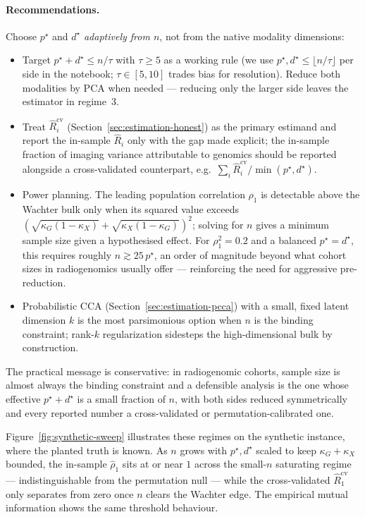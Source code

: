 \documentclass{article}
\begin{document}
\paragraph{Recommendations.} Choose $p^\star$ and $d^\star$ \emph{adaptively
from $n$}, not from the native modality dimensions:
\begin{itemize}
\item Target $p^\star + d^\star \le n/\tau$ with $\tau \ge 5$ as a working
rule (we use $p^\star, d^\star \le \lfloor n/\tau \rfloor$ per side in the
notebook; $\tau \in [5,10]$ trades bias for resolution). Reduce both
modalities by PCA when needed --- reducing only the larger side leaves the
estimator in regime~3.
\item Treat $\hat R_i^{\mathrm{cv}}$ (Section~\ref{sec:estimation-honest}) as
the primary estimand and report the in-sample $\hat R_i$ only with the gap
made explicit; the in-sample fraction of imaging variance attributable to
genomics should be reported alongside a cross-validated counterpart, e.g.\
$\sum_i \hat R_i^{\mathrm{cv}}/\min(p^\star, d^\star)$.
\item Power planning. The leading population correlation $\rho_1$ is detectable
above the Wachter bulk only when its squared value exceeds
$(\sqrt{\kappa_G(1-\kappa_X)} + \sqrt{\kappa_X(1-\kappa_G)})^2$; solving for $n$
gives a minimum sample size given a hypothesised effect. For
$\rho_1^2 = 0.2$ and a balanced $p^\star = d^\star$, this requires roughly
$n \gtrsim 25\,p^\star$, an order of magnitude beyond what cohort sizes in
radiogenomics usually offer --- reinforcing the need for aggressive
pre-reduction.
\item Probabilistic CCA (Section~\ref{sec:estimation-pcca}) with a small,
fixed latent dimension $k$ is the most parsimonious option when $n$ is the
binding constraint; rank-$k$ regularization sidesteps the high-dimensional
bulk by construction.
\end{itemize}

The practical message is conservative: in radiogenomic cohorts, sample size
is almost always the binding constraint and a defensible analysis is the one
whose effective $p^\star + d^\star$ is a small fraction of $n$, with both
sides reduced symmetrically and every reported number a cross-validated or
permutation-calibrated one.

Figure~\ref{fig:synthetic-sweep} illustrates these regimes on the synthetic
instance, where the planted truth is known. As $n$ grows with $p^\star, d^\star$
scaled to keep $\kappa_G + \kappa_X$ bounded, the in-sample $\hat\rho_1$ sits at
or near $1$ across the small-$n$ saturating regime --- indistinguishable from
the permutation null --- while the cross-validated $\hat R_1^{\mathrm{cv}}$ only
separates from zero once $n$ clears the Wachter edge. The empirical mutual
information shows the same threshold behaviour.
\end{document}
